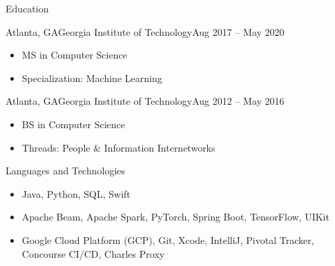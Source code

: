 \documentclass[]{mcdowellcv}
\begin{document}
	\makeheader
	
	\begin{cvsection}{Education}
		\begin{cvsubsection}{Atlanta, GA}{Georgia Institute of Technology}{Aug 2017 -- May 2020}
			\begin{itemize}
				\item MS in Computer Science
				\item Specialization: Machine Learning
			\end{itemize}
		\end{cvsubsection}
		\begin{cvsubsection}{Atlanta, GA}{Georgia Institute of Technology}{Aug 2012 -- May 2016}
			\begin{itemize}
				\item BS in Computer Science
				\item Threads: People \& Information Internetworks
			\end{itemize}
		\end{cvsubsection}
	\end{cvsection}

	\begin{cvsection}{Languages and Technologies}
		\begin{cvsubsection}{}{}{}	
			\begin{itemize}
				\item Java, Python, SQL, Swift
				\item Apache Beam, Apache Spark, PyTorch, Spring Boot, TensorFlow, UIKit
				\item Google Cloud Platform (GCP), Git, Xcode, IntelliJ, Pivotal Tracker, Concourse CI/CD, Charles Proxy
			\end{itemize}
		\end{cvsubsection}
	\end{cvsection}
	
\end{document}
